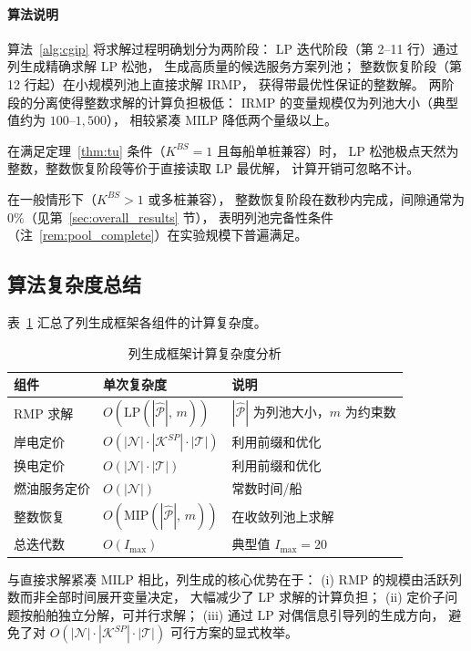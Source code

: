 \documentclass[UTF8, a4paper, 12pt]{ctexart}
\theoremstyle{plain}
\theoremstyle{definition}
\theoremstyle{remark}
\begin{document}
\paragraph{算法说明}
算法~\ref{alg:cgip} 将求解过程明确划分为两阶段：
LP 迭代阶段（第 2--11 行）通过列生成精确求解 LP 松弛，
生成高质量的候选服务方案列池；
整数恢复阶段（第 12 行起）在小规模列池上直接求解 IRMP，
获得带最优性保证的整数解。
两阶段的分离使得整数求解的计算负担极低：
IRMP 的变量规模仅为列池大小（典型值约为 $100$--$1{,}500$），
相较紧凑 MILP 降低两个量级以上。

在满足定理~\ref{thm:tu} 条件（$K^{BS}=1$ 且每船单桩兼容）时，
LP 松弛极点天然为整数，整数恢复阶段等价于直接读取 LP 最优解，
计算开销可忽略不计。

在一般情形下（$K^{BS}>1$ 或多桩兼容），
整数恢复阶段在数秒内完成，间隙通常为 $0\%$（见第~\ref{sec:overall_results} 节），
表明列池完备性条件（注~\ref{rem:pool_complete}）在实验规模下普遍满足。

\subsection{算法复杂度总结}
\label{sec:cg_complexity}

表~\ref{tab:complexity} 汇总了列生成框架各组件的计算复杂度。

\begin{table}[htbp]
\centering
\caption{列生成框架计算复杂度分析}
\label{tab:complexity}
\begin{tabular}{lll}
\toprule
组件 & 单次复杂度 & 说明 \\
\midrule
RMP 求解 & $O(\text{LP}(|\hat{\mathcal{P}}|,\, m))$
  & $|\hat{\mathcal{P}}|$ 为列池大小，$m$ 为约束数 \\
岸电定价 & $O(|\mathcal{N}| \cdot |\mathcal{K}^{SP}| \cdot |\mathcal{T}|)$
  & 利用前缀和优化 \\
换电定价 & $O(|\mathcal{N}| \cdot |\mathcal{T}|)$
  & 利用前缀和优化 \\
燃油服务定价 & $O(|\mathcal{N}|)$
  & 常数时间/船 \\
整数恢复 & $O(\text{MIP}(|\hat{\mathcal{P}}|,\, m))$
  & 在收敛列池上求解 \\
\midrule
总迭代数 & $O(I_{\max})$
  & 典型值 $I_{\max} = 20$ \\
\bottomrule
\end{tabular}
\end{table}

\noindent
与直接求解紧凑 MILP 相比，列生成的核心优势在于：
(i) RMP 的规模由活跃列数而非全部时间展开变量决定，
大幅减少了 LP 求解的计算负担；
(ii) 定价子问题按船舶独立分解，可并行求解；
(iii) 通过 LP 对偶信息引导列的生成方向，
避免了对 $O(|\mathcal{N}| \cdot |\mathcal{K}^{SP}| \cdot |\mathcal{T}|)$
可行方案的显式枚举。
\end{document}
